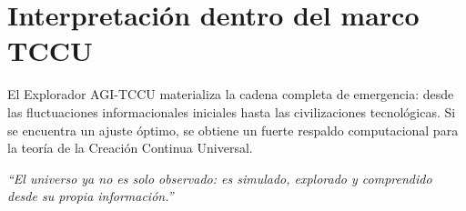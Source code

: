 \section{Interpretación dentro del marco TCCU}
El Explorador AGI-TCCU materializa la cadena completa de emergencia: desde las fluctuaciones informacionales iniciales hasta las civilizaciones tecnológicas. Si se encuentra un ajuste óptimo, se obtiene un fuerte respaldo computacional para la teoría de la Creación Continua Universal.

\bigskip
\noindent\textit{“El universo ya no es solo observado: es simulado, explorado y comprendido desde su propia información.”}
